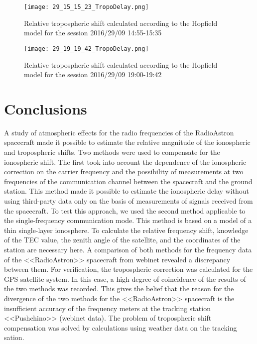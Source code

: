 \documentclass[a4paper,english,bopenany]{article}
\begin{document}
\begin{figure}[ht!] 
	\label{ fig8} 

	\centering{}
	\texttt{[image: 29\_15\_15\_23\_TropoDelay.png]}
	\caption{Relative tropospheric shift calculated according to the Hopfield model for the session 2016/29/09 14:55-15:35}
	\label{fig:Tropo29091455}
			\vspace{4ex} 
		\end{figure}
\begin{figure}[ht!] 
		\centering
	\texttt{[image: 29\_19\_19\_42\_TropoDelay.png]}
	\caption{Relative tropospheric shift calculated according to the Hopfield model for the session 2016/29/09 19:00-19:42}
	\label{fig:29_19_19_42_TropoDelay}
		\vspace{4ex} 
		
 
\end{figure}


\section{Conclusions}
A study of atmospheric effects for the radio frequencies of the RadioAstron spacecraft made it possible to estimate the relative magnitude of the ionospheric and tropospheric shifts. Two methods were used to compensate for the ionospheric shift. The first took into account the dependence of the ionospheric correction on the carrier frequency and the possibility of measurements at two frequencies of the communication channel between the spacecraft and the ground station. This method made it possible to estimate the ionospheric delay without using third-party data only on the basis of measurements of signals received from the spacecraft. To test this approach, we used the second method applicable to the single-frequency communication mode. This method is based on a model of a thin single-layer ionosphere. To calculate the relative frequency shift, knowledge of the TEC value, the zenith angle of the satellite, and the coordinates of the station are necessary here. A comparison of both methods for the frequency data of the <<RadioAstron>> spacecraft from webinet revealed a discrepancy between them. For verification, the tropospheric correction was calculated for the GPS satellite system. In this case, a high degree of coincidence of the results of the two methods was recorded. This gives the belief that the reason for the divergence of the two methods for the <<RadioAstron>> spacecraft is the insufficient accuracy of the frequency meters at the tracking station <<Pushchino>>  (webinet data). The problem of tropospheric shift compensation was solved by calculations using weather data on the tracking sation.
\end{document}
